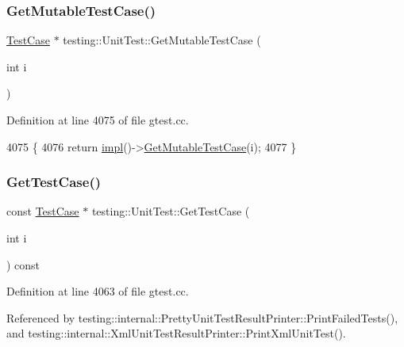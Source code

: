 \subsubsection{\texorpdfstring{Get\+Mutable\+Test\+Case()}{GetMutableTestCase()}}
{\footnotesize\ttfamily \hyperlink{classtesting_1_1TestCase}{Test\+Case} $\ast$ testing\+::\+Unit\+Test\+::\+Get\+Mutable\+Test\+Case (\begin{DoxyParamCaption}\item[{int}]{i }\end{DoxyParamCaption})\hspace{0.3cm}{\ttfamily [private]}}



Definition at line 4075 of file gtest.\+cc.


\begin{DoxyCode}
4075                                             \{
4076   \textcolor{keywordflow}{return} \hyperlink{classtesting_1_1UnitTest_a4df5d11a58affb337d7fa62eaa07690e}{impl}()->\hyperlink{classtesting_1_1internal_1_1UnitTestImpl_a2ca71a08060037357fc7e1a406b89add}{GetMutableTestCase}(i);
4077 \}
\end{DoxyCode}
\mbox{\label{classtesting_1_1UnitTest_a724d4c8be4481e0c1523a22b72dc7dac}} 
\subsubsection{\texorpdfstring{Get\+Test\+Case()}{GetTestCase()}}
{\footnotesize\ttfamily const \hyperlink{classtesting_1_1TestCase}{Test\+Case} $\ast$ testing\+::\+Unit\+Test\+::\+Get\+Test\+Case (\begin{DoxyParamCaption}\item[{int}]{i }\end{DoxyParamCaption}) const}



Definition at line 4063 of file gtest.\+cc.



Referenced by testing\+::internal\+::\+Pretty\+Unit\+Test\+Result\+Printer\+::\+Print\+Failed\+Tests(), and testing\+::internal\+::\+Xml\+Unit\+Test\+Result\+Printer\+::\+Print\+Xml\+Unit\+Test().


